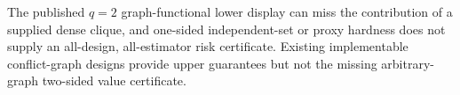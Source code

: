 The published \(q=2\) graph-functional lower display can miss the contribution of a supplied dense clique, and one-sided independent-set or proxy hardness does not supply an all-design, all-estimator risk certificate.  Existing implementable conflict-graph designs provide upper guarantees but not the missing arbitrary-graph two-sided value certificate.